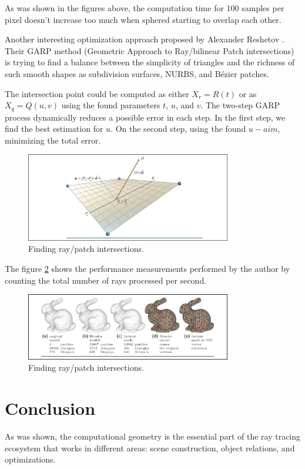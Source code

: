 \documentclass[12pt,a4paper,english]{article}
\begin{document}
As was shown in the figures above, the computation time for 100 samples per pixel doesn't increase too much when sphered starting to overlap each other.

Another interesting optimization approach proposed by Alexander Reshetov \cite{Reshetov_2019}. Their GARP method (Geometric Approach to Ray/bilinear Patch intersections) is trying to find a balance between the simplicity of triangles and the richness of such smooth shapes as subdivision surfaces, NURBS, and Bézier patches.

The intersection point could be computed as either $X_r = R(t)$ or as $X_q = Q(u, v)$ using the found parameters $t$, $u$, and $v$. The two-step GARP process dynamically reduces a possible error in each step. In the first step, we find the best estimation for $u$. On the second step, using the found $u-aim$, minimizing the total error.

\begin{figure}[H]
    \centering
    \includegraphics[width=0.8\textwidth]{garp}
    \caption[]{Finding ray/patch intersections.}
    \label{fig:garp}
\end{figure}

The figure \ref{fig:garp_bunny} shows the performance measurements performed by the author by counting the total number of rays processed per second.

\begin{figure}[H]
    \centering
    \includegraphics[width=0.8\textwidth]{garp_bunny}
    \caption[]{Finding ray/patch intersections.}
    \label{fig:garp_bunny}
\end{figure}

\section{Conclusion}

As was shown, the computational geometry is the essential part of the ray tracing ecosystem that works in different areas: scene construction, object relations, and optimizations.

\nocite{*}


\end{document}
